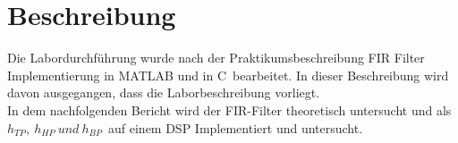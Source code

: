\section{Beschreibung}
Die Labordurchführung wurde nach der Praktikumsbeschreibung \glqq FIR Filter Implementierung in MATLAB und in C\grqq~bearbeitet. In dieser Beschreibung wird davon ausgegangen, dass die Laborbeschreibung vorliegt.\\
In dem nachfolgenden Bericht wird der FIR-Filter theoretisch untersucht und als\\$h_{TP},~h_{HP}~und~h_{BP}$~auf einem DSP Implementiert und untersucht.

